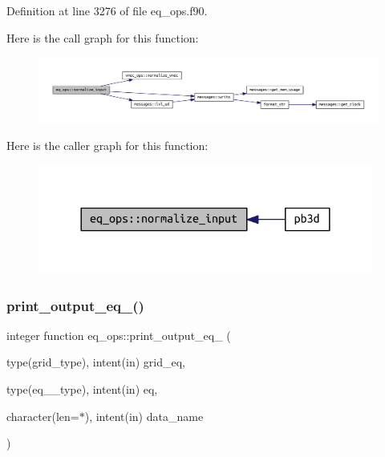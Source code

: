 Definition at line 3276 of file eq\+\_\+ops.\+f90.

Here is the call graph for this function\+:
\nopagebreak
\begin{figure}[H]
\begin{center}
\leavevmode
\includegraphics[width=350pt]{namespaceeq__ops_a1b4c764da73624722d7e76498a2b80a9_cgraph}
\end{center}
\end{figure}
Here is the caller graph for this function\+:
\nopagebreak
\begin{figure}[H]
\begin{center}
\leavevmode
\includegraphics[width=312pt]{namespaceeq__ops_a1b4c764da73624722d7e76498a2b80a9_icgraph}
\end{center}
\end{figure}
\mbox{\label{namespaceeq__ops_ad7c123990ab1ff23dbd71bb47c3181b8}} 
\subsubsection{\texorpdfstring{print\+\_\+output\+\_\+eq\+\_()}{print\_output\_eq\_1()}}
{\footnotesize\ttfamily integer function eq\+\_\+ops\+::print\+\_\+output\+\_\+eq\+\_ (\begin{DoxyParamCaption}\item[{type(grid\+\_\+type), intent(in)}]{grid\+\_\+eq,  }\item[{type(eq\+\_\+1\+\_\+type), intent(in)}]{eq,  }\item[{character(len=$\ast$), intent(in)}]{data\+\_\+name }\end{DoxyParamCaption})}



